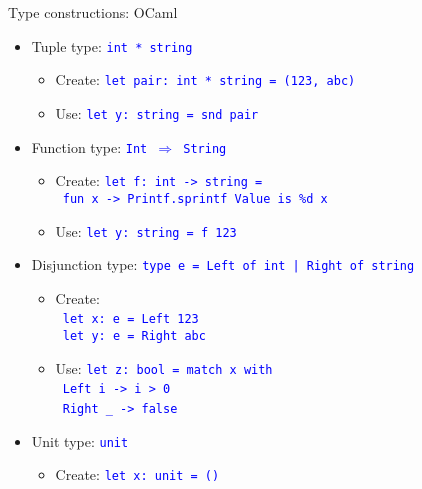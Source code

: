 \documentclass[english]{beamer}
\begin{document}
\begin{frame}{Type constructions: OCaml}

\begin{itemize}
\item Tuple type: \texttt{\textcolor{blue}{\footnotesize{}int {*} string}}{\footnotesize \par}
\begin{itemize}
\item Create: \texttt{\textcolor{blue}{\footnotesize{}let pair:\ int {*}
string = (123, \textquotedbl{}abc\textquotedbl{})}} 
\item Use: \texttt{\textcolor{blue}{\footnotesize{}let y:\ string = snd
pair}}{\footnotesize \par}
\end{itemize}
\item Function type: \texttt{\textcolor{blue}{\footnotesize{}Int $\Rightarrow$
String}}{\footnotesize \par}
\begin{itemize}
\item Create: \texttt{\textcolor{blue}{\footnotesize{}let f:\ int -> string
=}}~\\
\texttt{\textcolor{blue}{\footnotesize{} fun x -> Printf.sprintf \textquotedbl{}Value
is \%d\textquotedbl{} x}} 
\item Use: \texttt{\textcolor{blue}{\footnotesize{}let y:\ string = f 123}}{\footnotesize \par}
\end{itemize}
\item Disjunction type: \texttt{\textcolor{blue}{\footnotesize{}type e =
Left of int | Right of string}}{\footnotesize \par}
\begin{itemize}
\item Create:\\
 \texttt{\textcolor{blue}{\footnotesize{}\ let x:\ e = Left 123}}~\\
\texttt{\textcolor{blue}{\footnotesize{} let y:\ e = Right \textquotedbl{}abc\textquotedbl{}}}{\footnotesize \par}
\item Use: \texttt{\textcolor{blue}{\footnotesize{}let z:\ bool = match
x with}}~\\
\texttt{\textcolor{blue}{\footnotesize{} Left i -> i > 0}}~\\
\texttt{\textcolor{blue}{\footnotesize{} Right \_ -> false}}~\\
{\footnotesize \par}
\end{itemize}
\item Unit type: \texttt{\textcolor{blue}{\footnotesize{}unit}}{\footnotesize \par}
\begin{itemize}
\item Create: \texttt{\textcolor{blue}{\footnotesize{}let x:\ unit = ()}}{\footnotesize \par}
\end{itemize}
\end{itemize}
\end{frame}
\end{document}
